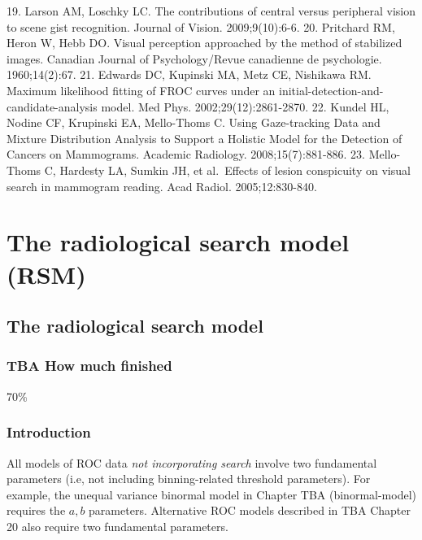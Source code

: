 \documentclass[
]{book}
\begin{document}
19. Larson AM, Loschky LC. The contributions of central versus peripheral vision to scene gist recognition. Journal of Vision. 2009;9(10):6-6.
20. Pritchard RM, Heron W, Hebb DO. Visual perception approached by the method of stabilized images. Canadian Journal of Psychology/Revue canadienne de psychologie. 1960;14(2):67.
21. Edwards DC, Kupinski MA, Metz CE, Nishikawa RM. Maximum likelihood fitting of FROC curves under an initial-detection-and-candidate-analysis model. Med Phys. 2002;29(12):2861-2870.
22. Kundel HL, Nodine CF, Krupinski EA, Mello-Thoms C. Using Gaze-tracking Data and Mixture Distribution Analysis to Support a Holistic Model for the Detection of Cancers on Mammograms. Academic Radiology. 2008;15(7):881-886.
23. Mello-Thoms C, Hardesty LA, Sumkin JH, et al.~Effects of lesion conspicuity on visual search in mammogram reading. Acad Radiol. 2005;12:830-840.

\hypertarget{part-the-radiological-search-model-rsm}{%
\part*{The radiological search model (RSM)}\label{part-the-radiological-search-model-rsm}}

\hypertarget{rsm}{%
\chapter{The radiological search model}\label{rsm}}

\hypertarget{rsm-how-much-finished}{%
\section{TBA How much finished}\label{rsm-how-much-finished}}

70\%

\hypertarget{rsm-intro}{%
\section{Introduction}\label{rsm-intro}}

All models of ROC data \emph{not incorporating search} involve two fundamental parameters (i.e, not including binning-related threshold parameters). For example, the unequal variance binormal model in Chapter TBA (binormal-model) requires the \(a,b\) parameters. Alternative ROC models described in TBA Chapter 20 also require two fundamental parameters.
\end{document}
